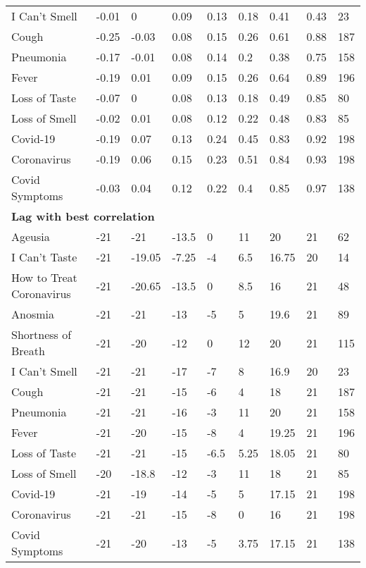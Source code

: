 \begin{tabular}{l llllllll}
I Can't Smell & -0.01 & 0 & 0.09 & 0.13 & 0.18 & 0.41 & 0.43 & 23  \\ 
Cough & -0.25 & -0.03 & 0.08 & 0.15 & 0.26 & 0.61 & 0.88 & 187  \\ 
Pneumonia & -0.17 & -0.01 & 0.08 & 0.14 & 0.2 & 0.38 & 0.75 & 158  \\ 
Fever & -0.19 & 0.01 & 0.09 & 0.15 & 0.26 & 0.64 & 0.89 & 196  \\ 
Loss of Taste & -0.07 & 0 & 0.08 & 0.13 & 0.18 & 0.49 & 0.85 & 80  \\ 
Loss of Smell & -0.02 & 0.01 & 0.08 & 0.12 & 0.22 & 0.48 & 0.83 & 85  \\ 
Covid-19 & -0.19 & 0.07 & 0.13 & 0.24 & 0.45 & 0.83 & 0.92 & 198  \\ 
Coronavirus & -0.19 & 0.06 & 0.15 & 0.23 & 0.51 & 0.84 & 0.93 & 198  \\ 
Covid Symptoms & -0.03 & 0.04 & 0.12 & 0.22 & 0.4 & 0.85 & 0.97 & 138  \\ 
\hline 
\multicolumn{9}{l}{{\bf Lag with best correlation}} \\ 
Ageusia & -21 & -21 & -13.5 & 0 & 11 & 20 & 21 & 62  \\ 
I Can't Taste & -21 & -19.05 & -7.25 & -4 & 6.5 & 16.75 & 20 & 14  \\ 
How to Treat Coronavirus & -21 & -20.65 & -13.5 & 0 & 8.5 & 16 & 21 & 48  \\ 
Anosmia & -21 & -21 & -13 & -5 & 5 & 19.6 & 21 & 89  \\ 
Shortness of Breath & -21 & -20 & -12 & 0 & 12 & 20 & 21 & 115  \\ 
I Can't Smell & -21 & -21 & -17 & -7 & 8 & 16.9 & 20 & 23  \\ 
Cough & -21 & -21 & -15 & -6 & 4 & 18 & 21 & 187  \\ 
Pneumonia & -21 & -21 & -16 & -3 & 11 & 20 & 21 & 158  \\ 
Fever & -21 & -20 & -15 & -8 & 4 & 19.25 & 21 & 196  \\ 
Loss of Taste & -21 & -21 & -15 & -6.5 & 5.25 & 18.05 & 21 & 80  \\ 
Loss of Smell & -20 & -18.8 & -12 & -3 & 11 & 18 & 21 & 85  \\ 
Covid-19 & -21 & -19 & -14 & -5 & 5 & 17.15 & 21 & 198  \\ 
Coronavirus & -21 & -21 & -15 & -8 & 0 & 16 & 21 & 198  \\ 
Covid Symptoms & -21 & -20 & -13 & -5 & 3.75 & 17.15 & 21 & 138  \\ 
\hline 
\end{tabular} 